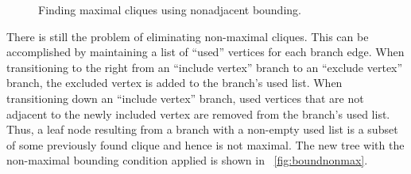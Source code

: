 \begin{figure}[H]
  \centering
  \caption{Finding maximal cliques using nonadjacent bounding.}
  \label{fig:boundnonadj}
\end{figure}

There is still the problem of eliminating non-maximal cliques.  This can be accomplished by maintaining a list of
``used'' vertices for each branch edge.  When transitioning to the right from an ``include vertex'' branch to an
``exclude vertex'' branch, the excluded vertex is added to the branch's used list.  When transitioning down an
``include vertex'' branch, used vertices that are not adjacent to the newly included vertex are removed from the
branch's used list.  Thus, a leaf node resulting from a branch with a non-empty used list is a subset of some
previously found clique and hence is not maximal.  The new tree with the non-maximal bounding condition applied is
shown in \figurename~\ref{fig:boundnonmax}.

